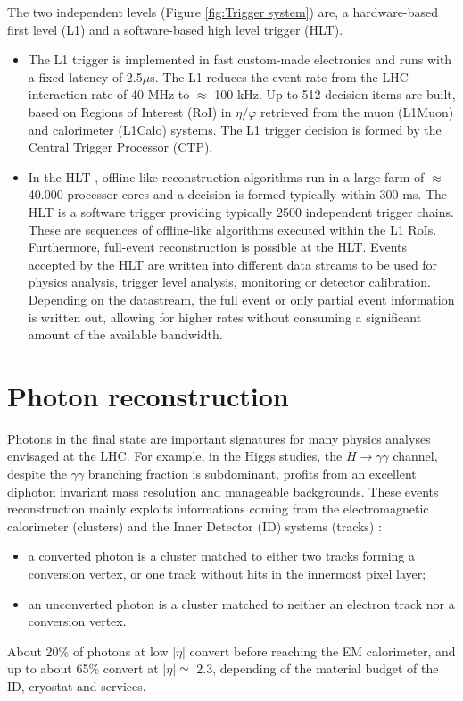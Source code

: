\documentclass[a4paper, oneside, 11pt, openright]{book}
\begin{document}
				The two independent levels (Figure \ref{fig:Trigger system}) are, a hardware-based first level (L1) and a software-based high level trigger (HLT). 
				\begin{itemize}
					\item The L1 trigger \cite{L1_trigger} is implemented in fast custom-made electronics and runs with a fixed latency of 2.5$\mu$s. The L1 reduces the event rate from the LHC interaction rate of 40 MHz to $\approx$ 100 kHz. Up to 512 decision items are built, based on Regions of Interest (RoI) in $\eta/\varphi$ retrieved from the muon (L1Muon) and calorimeter (L1Calo) systems. The L1 trigger decision is formed by the Central Trigger Processor (CTP). %
					
					\item In the HLT \cite{HLT_trigger}, offline-like reconstruction algorithms run in a large farm of $\approx$ 40.000 processor cores and a decision is formed typically within 300 ms. The HLT is a software trigger providing typically 2500 independent trigger chains. These are sequences of offline-like algorithms executed within the L1 RoIs. Furthermore, full-event reconstruction is possible at the HLT. Events accepted by the HLT are written into different data streams to be used for physics analysis, trigger level analysis, monitoring or detector calibration. Depending on the datastream, the full event or only partial event information is written out, allowing for higher rates without consuming a significant amount of the available bandwidth.
				\end{itemize}
		
	
	\chapter{Photon reconstruction}\label{chapter:2}
		Photons in the final state are important signatures for many physics analyses envisaged at the LHC. For example, in the Higgs studies, the $H \to \gamma\gamma$ channel, despite the $\gamma\gamma$ branching fraction is subdominant, profits from an excellent diphoton invariant mass resolution and manageable backgrounds. These events reconstruction mainly exploits informations coming from the electromagnetic calorimeter (clusters) and the Inner Detector (ID) systems (tracks) \cite{Aad_2019}:
		\begin{itemize}
			\item a converted photon is a cluster matched to either two tracks forming a conversion vertex, or one track without hits in the innermost pixel layer;
			\item an unconverted photon is a cluster matched to neither an electron track nor a conversion vertex.
		\end{itemize}
		About 20\% of photons at low $|\eta|$ convert before reaching the EM calorimeter, and up to about 65\% convert at $|\eta| \simeq$ 2.3, depending of the material budget of the ID, cryostat and services.
		
\end{document}
